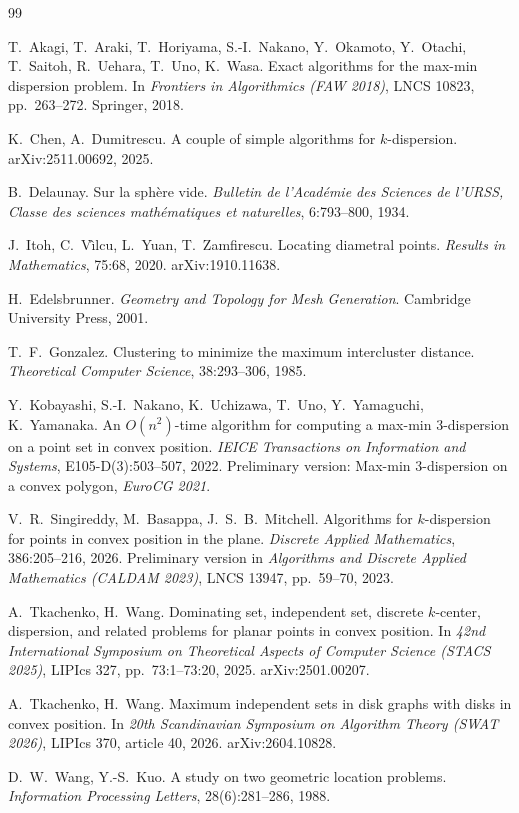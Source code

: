 \documentclass[11pt,a4paper]{article}
\theoremstyle{definition}
\theoremstyle{remark}
\begin{document}
\begin{thebibliography}{99}\itemsep=1pt

T.~Akagi, T.~Araki, T.~Horiyama, S.-I.~Nakano, Y.~Okamoto, Y.~Otachi,
T.~Saitoh, R.~Uehara, T.~Uno, K.~Wasa.
\newblock Exact algorithms for the max-min dispersion problem.
\newblock In \emph{Frontiers in Algorithmics (FAW 2018)}, LNCS 10823,
pp.~263--272. Springer, 2018.

K.~Chen, A.~Dumitrescu.
\newblock A couple of simple algorithms for $k$-dispersion.
\newblock arXiv:2511.00692, 2025.

B.~Delaunay.
\newblock Sur la sph\`ere vide.
\newblock \emph{Bulletin de l'Acad\'emie des Sciences de l'URSS, Classe des
sciences math\'ematiques et naturelles}, 6:793--800, 1934.

J.~Itoh, C.~V\^{\i}lcu, L.~Yuan, T.~Zamfirescu.
\newblock Locating diametral points.
\newblock \emph{Results in Mathematics}, 75:68, 2020. arXiv:1910.11638.

H.~Edelsbrunner.
\newblock \emph{Geometry and Topology for Mesh Generation}.
\newblock Cambridge University Press, 2001.

T.~F.~Gonzalez.
\newblock Clustering to minimize the maximum intercluster distance.
\newblock \emph{Theoretical Computer Science}, 38:293--306, 1985.

Y.~Kobayashi, S.-I.~Nakano, K.~Uchizawa, T.~Uno, Y.~Yamaguchi, K.~Yamanaka.
\newblock An $O(n^2)$-time algorithm for computing a max-min 3-dispersion on a
point set in convex position.
\newblock \emph{IEICE Transactions on Information and Systems},
E105-D(3):503--507, 2022. Preliminary version: Max-min 3-dispersion on a
convex polygon, \emph{EuroCG 2021}.

V.~R.~Singireddy, M.~Basappa, J.~S.~B.~Mitchell.
\newblock Algorithms for $k$-dispersion for points in convex position in the
plane.
\newblock \emph{Discrete Applied Mathematics}, 386:205--216, 2026. Preliminary version in
\emph{Algorithms and Discrete Applied Mathematics (CALDAM 2023)}, LNCS 13947,
pp.~59--70, 2023.

A.~Tkachenko, H.~Wang.
\newblock Dominating set, independent set, discrete $k$-center, dispersion,
and related problems for planar points in convex position.
\newblock In \emph{42nd International Symposium on Theoretical Aspects of
Computer Science (STACS 2025)}, LIPIcs 327, pp.~73:1--73:20, 2025.
arXiv:2501.00207.

A.~Tkachenko, H.~Wang.
\newblock Maximum independent sets in disk graphs with disks in convex
position.
\newblock In \emph{20th Scandinavian Symposium on Algorithm Theory (SWAT
2026)}, LIPIcs 370, article 40, 2026. arXiv:2604.10828.

D.~W.~Wang, Y.-S.~Kuo.
\newblock A study on two geometric location problems.
\newblock \emph{Information Processing Letters}, 28(6):281--286, 1988.

\end{thebibliography}
\end{document}
